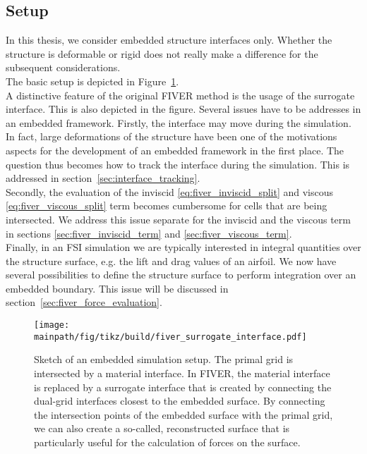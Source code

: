 \documentclass[../main.tex]{subfiles}
\begin{document}
\subsection{Setup}\label{sec:fiver_setup}
In this thesis, we consider embedded structure interfaces only. Whether the structure is deformable or rigid does not really make a difference for the subsequent considerations.\\
The basic setup is depicted in Figure~\ref{fig:FIVER_intersection}.\\
A distinctive feature of the original \ac{FIVER} method is the usage of the surrogate interface. This is also depicted in the figure.
Several issues have to be addresses in an embedded framework. Firstly, the interface may move during the simulation. In fact, large deformations of the structure have been one of the motivations aspects for the development of an embedded framework in the first place. The question thus becomes how to track the interface during the simulation. This is addressed in section~\ref{sec:interface_tracking}.\\
Secondly, the evaluation of the inviscid \eqref{eq:fiver_inviscid_split} and viscous \eqref{eq:fiver_viscous_split} term becomes cumbersome for cells that are being intersected. We address this issue separate for the inviscid and the viscous term in sections \ref{sec:fiver_inviscid_term} and \ref{sec:fiver_viscous_term}.\\
Finally, in an \ac{FSI} simulation we are typically interested in integral quantities over the structure surface, e.g. the lift and drag values of an airfoil. We now have several possibilities to define the structure surface to perform integration over an embedded boundary. This issue will be discussed in section~\ref{sec:fiver_force_evaluation}.

\begin{figure}[h!]
	\begin{center}
        \texttt{[image: \\mainpath/fig/tikz/build/fiver\_surrogate\_interface.pdf]}
        \caption[FIVER setup]{Sketch of an embedded simulation setup. The primal grid is intersected by a material interface. In \ac{FIVER}, the material interface is replaced by a surrogate interface that is created by connecting the dual-grid interfaces closest to the embedded surface. By connecting the intersection points of the embedded surface with the primal grid, we can also create a so-called, reconstructed surface that is particularly useful for the calculation of forces on the surface.}
		\label{fig:FIVER_intersection}
    \end{center}
\end{figure}
\end{document}
